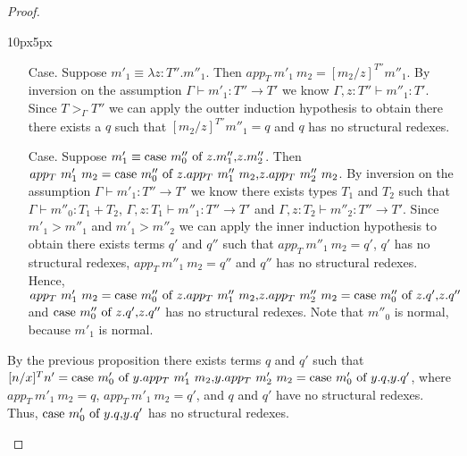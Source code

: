 \begin{proof}
\begin{changemargin}{10px}{5px}
\begin{itemize}
\begin{itemize}
  \item[Case.] Suppose $m'_1 \equiv \lambda z:T''.m''_1$.  Then $app_T\ m'_1\ m_2 = [m_2/z]^{T''} m''_1$.
    By inversion on the assumption $\Gamma \vdash m'_1:T'' \to T'$ we know 
    $\Gamma,z:T'' \vdash m''_1:T'$.  Since $T >_{\Gamma} T''$ we can apply the outter induction
    hypothesis to obtain there there exists a $q$ such that $[m_2/z]^{T''} m''_1 = q$ and 
    $q$ has no structural redexes.
    
  \item[Case.] Suppose $m'_1 \equiv \mbox{case}\ m''_0\ \text{of}\ z\text{.}m''_1\text{,}z\text{.}m''_2$.  Then\\
    $app_T\ m'_1\ m_2 = \ccon{m''_0}{z}{app_T\ m''_1\ m_2}{app_T\ m''_2\ m_2}$.  By inversion on the assumption
    $\Gamma \vdash m'_1:T''\to T'$ we know there exists types $T_1$ and $T_2$ such that
    $\Gamma \vdash m''_0:T_1+T_2$, $\Gamma,z:T_1 \vdash m''_1:T''\to T'$
    and $\Gamma,z:T_2 \vdash m''_2:T''\to T'$.  Since $m'_1 > m''_1$ and $m'_1 > m''_2$ we can 
    apply the inner induction hypothesis to obtain there exists terms $q'$ and $q''$ such that 
    $app_T\ m''_1\ m_2 = q'$, $q'$ has no structural redexes, $app_T\ m''_1\ m_2 = q''$ and $q''$ has no structural redexes.  
    Hence, 
    $app_T\ m'_1\ m_2 = \ccon{m''_0}{z}{app_T\ m''_1\ m_2}{app_T\ m''_2\ m_2} = \ccon{m''_0}{z}{q'}{q''}$ and
    $\mbox{case}\ m''_0\ \text{of}\ z\text{.}q'\text{,}z\text{.}q''$ has no structural redexes.  Note that $m''_0$ is normal, because $m'_1$ is
    normal.  
  \end{itemize}

  By the previous proposition there exists terms $q$ and $q'$ such that \\
  $[n/x]^T n' = \ccon{m'_0}{y}{app_T\ m'_1\ m_2}{app_T\ m'_2\ m_2}
  = \ccon{m'_0}{y}{q}{q'}$, where $app_T\ m'_1\ m_2 = q$, $app_T\ m'_1\ m_2 = q'$, and
  $q$ and $q'$ have no structural redexes.  Thus, $\mbox{case}\ m'_0\ \text{of}\ y\text{.}q\text{,}y\text{.}q'$ has no
  structural redexes.  
  

\end{itemize}
\end{changemargin}
\end{proof}
